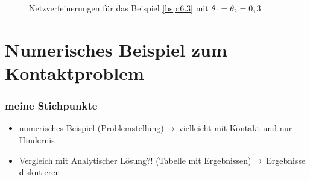 \begin{bsp}
\begin{figure}[h]
\begin{center}
\hfill
{}
\end{center}
\caption{Netzverfeinerungen für das Beispiel \ref{bsp:6.3} mit $\theta_1=\theta_2=0,3$}
\end{figure}
\end{bsp}


\section{Numerisches Beispiel zum Kontaktproblem}
\label{kap:6.2}



\subsubsection{meine Stichpunkte}

\begin{itemize}
\item numerisches Beispiel (Problemstellung) $\rightarrow$ vielleicht mit Kontakt und nur Hindernis
\item Vergleich mit Analytischer Lösung?! (Tabelle mit Ergebnissen) $\rightarrow$ Ergebnisse diskutieren
\end{itemize}


\newpage

